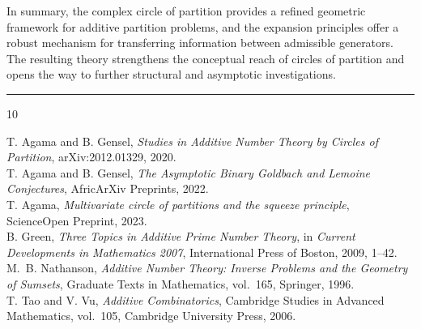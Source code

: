 \documentclass[12pt]{amsart}
\theoremstyle{definition}
\theoremstyle{remark}
\numberwithin{equation}{section}
\begin{document}
In summary, the complex circle of partition provides a refined geometric framework for additive partition problems, and the expansion principles offer a robust mechanism for transferring information between admissible generators. The resulting theory strengthens the conceptual reach of circles of partition and opens the way to further structural and asymptotic investigations.



\noindent\rule{100pt}{1pt}


\begin{thebibliography}{10}

T. Agama and B. Gensel, \emph{Studies in Additive Number Theory by Circles of Partition}, arXiv:2012.01329, 2020.\\

T. Agama and B. Gensel,
\emph{The Asymptotic Binary Goldbach and Lemoine Conjectures}, AfricArXiv Preprints, 2022.\\

 T. Agama, \emph{Multivariate circle of partitions and the squeeze principle}, ScienceOpen Preprint, 2023.\\

 B. Green, \emph{Three Topics in Additive Prime Number Theory}, in \emph{Current Developments in Mathematics 2007}, International Press of Boston, 2009, 1--42.\\

 M.~B. Nathanson, \emph{Additive Number Theory: Inverse Problems and the Geometry of Sumsets}, Graduate Texts in Mathematics, vol.~165, Springer, 1996.\\

 T. Tao and V. Vu, \emph{Additive Combinatorics},
Cambridge Studies in Advanced Mathematics, vol.~105, Cambridge University Press, 2006.\\

\end{thebibliography}
\end{document}
